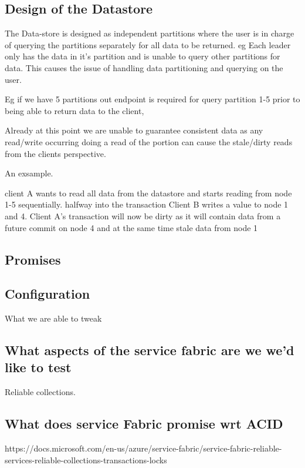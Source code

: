 \documentclass[a4paper,10pt,titlepage]{report}
\begin{document}
\subsection{Design of the Datastore}

The Data-store is designed as independent partitions where the user is in charge of querying the partitions separately for all data to be returned. eg Each leader only has the data in it's partition and is unable to query other partitions for data. This causes the issue of handling data partitioning and querying on the user.

Eg if we have 5 partitions out endpoint is required for query partition 1-5 prior to being able to return data to the client,

Already at this point we are unable to guarantee consistent data as any read/write occurring doing a read of the portion can cause the stale/dirty reads from the clients perspective.

An exsample.

client A wants to read all data from the datastore and starts reading from node 1-5 sequentially. halfway into the transaction Client B writes a value to node 1 and 4. Client A's transaction will now be dirty as it will contain data from a future commit on node 4 and at the same time stale data from node 1



\subsection{Promises}


\subsection{Configuration}


What we are able to tweak


\subsection{What aspects of the service fabric are we  we'd like to test}

Reliable collections.

\subsection{What does service Fabric promise wrt ACID}

https://docs.microsoft.com/en-us/azure/service-fabric/service-fabric-reliable-services-reliable-collections-transactions-locks
\end{document}
